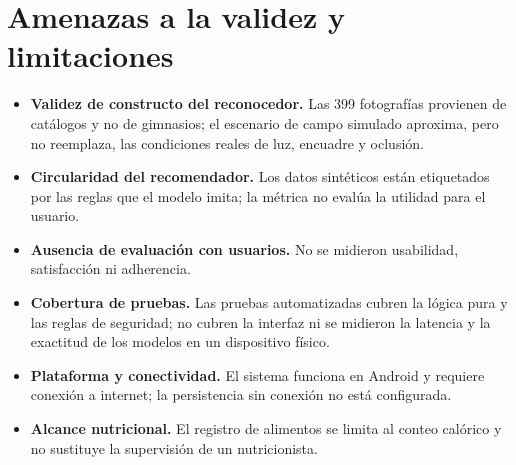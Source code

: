 \section{Amenazas a la validez y limitaciones}
\label{sec:amenazas}

\begin{itemize}
    \item \textbf{Validez de constructo del reconocedor.} Las 399 fotografías
    provienen de catálogos y no de gimnasios; el escenario de campo simulado
    aproxima, pero no reemplaza, las condiciones reales de luz, encuadre y
    oclusión.
    \item \textbf{Circularidad del recomendador.} Los datos sintéticos están
    etiquetados por las reglas que el modelo imita; la métrica no evalúa la
    utilidad para el usuario.
    \item \textbf{Ausencia de evaluación con usuarios.} No se midieron
    usabilidad, satisfacción ni adherencia. 
    \item \textbf{Cobertura de pruebas.} Las pruebas automatizadas cubren la
    lógica pura y las reglas de seguridad; no cubren la interfaz ni se midieron
    la latencia y la exactitud de los modelos en un dispositivo físico.
    \item \textbf{Plataforma y conectividad.} El sistema funciona en Android y
    requiere conexión a internet; la persistencia sin conexión no está
    configurada.
    \item \textbf{Alcance nutricional.} El registro de alimentos se limita al
    conteo calórico y no sustituye la supervisión de un nutricionista.
\end{itemize}
